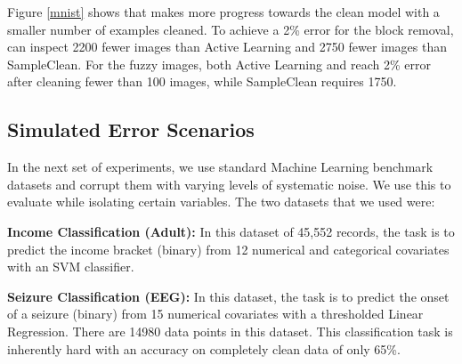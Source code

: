 Figure \ref{mnist} shows that \sys makes more progress towards the clean model with a smaller number of examples cleaned.
To achieve a 2\% error for the block removal, \sys can inspect 2200 fewer images than Active Learning and 2750 fewer images than SampleClean.
For the fuzzy images, both Active Learning and \sys reach 2\% error after cleaning fewer than 100 images, while SampleClean requires 1750.

\subsection{Simulated Error Scenarios}
In the next set of experiments, we use standard Machine Learning benchmark datasets and corrupt them with varying levels of systematic noise.
We use this to evaluate \sys while isolating certain variables.
The two datasets that we used were:

\vspace{0.25em}

\noindent\textbf{Income Classification (Adult): } In this dataset of 45,552 records, the task is to predict the income bracket (binary) from 12 numerical and categorical covariates with an SVM classifier. 

\vspace{0.25em}

\noindent\textbf{Seizure Classification (EEG): } In this dataset, the task is to predict the onset of a seizure (binary) from 15 numerical covariates with a thresholded Linear Regression. There are 14980 data points in this dataset. This classification task is inherently hard with an accuracy on completely clean data of only 65\%.

